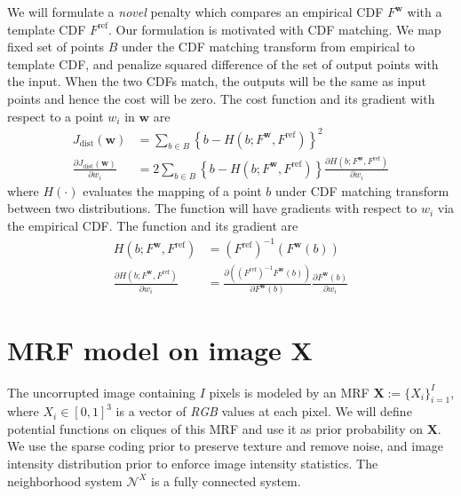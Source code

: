 We will formulate a \emph{novel} penalty which compares an empirical CDF $F^\mathbf{w}$ with a template CDF $F^\text{ref}$. Our formulation is motivated with CDF matching. We map fixed set of points $B$ under the CDF matching transform from empirical to template CDF, and penalize squared difference of the set of output points with the input. When the two CDFs match, the outputs will be the same as input points and hence the cost will be zero. The cost function and its gradient with respect to a point $w_i$ in $\mathbf{w}$ are
\begin{align}
    J_\text{dist} (\mathbf{w}) &= \sum_{b \in B} \left\lbrace b - H \left( b; F^\mathbf{w}, F^\text{ref} \right) \right\rbrace^2 \label{eqn:kdecost} \\
    \frac{ \partial J_\text{dist} (\mathbf{w})} { \partial w_i} &= 2 \sum_{b \in B} \left\lbrace b - H \left( b; F^\mathbf{w}, F^\text{ref} \right) \right\rbrace \frac{\partial H \left( b; F^\mathbf{w}, F^\text{ref} \right)}{\partial w_i}
\end{align}
where $H \left( \cdot \right)$ evaluates the mapping of a point $b$ under CDF matching transform between two distributions. The function will have gradients with respect to $w_i$ via the empirical CDF. The function and its gradient are
\begin{align}
    H \left( b; F^\mathbf{w}, F^\text{ref} \right) &= \left( F^\text{ref}\right)^{-1} \left( F^\mathbf{w} \left(b \right) \right) \label{eqn:cdfinv} \\
    \frac{\partial H \left( b; F^\mathbf{w}, F^\text{ref} \right)}{\partial w_i} &= \frac{ \partial \left( \left( F^\text{ref}\right)^{-1} F^\mathbf{w} \left(b\right) \right) } { \partial F^\mathbf{w} \left( b \right) } \frac{ \partial F^\mathbf{w} \left( b \right)} { \partial w_i}
\end{align}

\section{MRF model on image $\mathbf{X}$}
\label{sec:modelX}

The uncorrupted image containing $I$ pixels is modeled by an MRF $\mathbf{X} := \lbrace X_i \rbrace_{i=1}^{I}$, where $X_i \in \left[0, 1\right]^3$ is a vector of \emph{RGB} values at each pixel. We will define potential functions on cliques of this MRF and use it as prior probability on $\mathbf{X}$. We use the sparse coding prior to preserve texture and remove noise, and image intensity distribution prior to enforce image intensity statistics. The neighborhood system $\mathcal{N}^X$ is a fully connected system.

